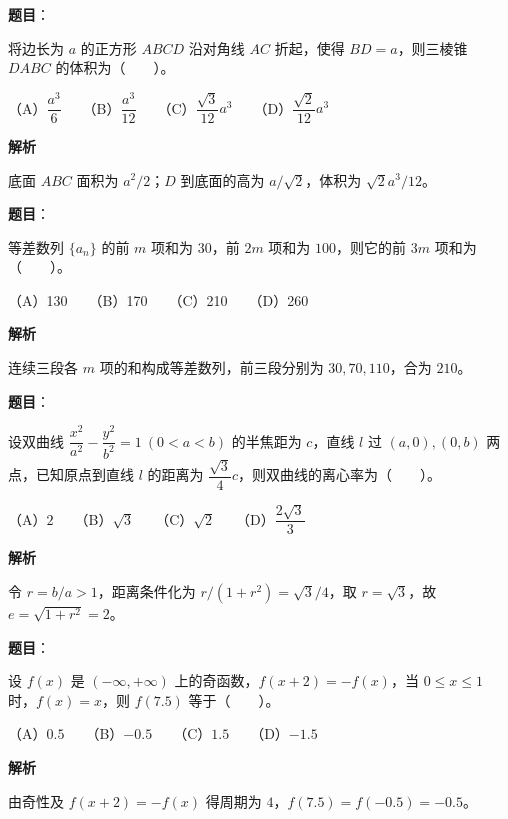 \begin{answer}

\textbf{题目}：

将边长为 $a$ 的正方形 $ABCD$ 沿对角线 $AC$ 折起，使得 $BD=a$，则三棱锥 $DABC$ 的体积为\mbox{（　　）}。

（A）$\dfrac{a^3}{6}$　　（B）$\dfrac{a^3}{12}$　　（C）$\dfrac{\sqrt{3}}{12}a^3$　　（D）$\dfrac{\sqrt{2}}{12}a^3$

\textbf{解析}

底面 $ABC$ 面积为 $a^2/2$；$D$ 到底面的高为 $a/\sqrt2$，体积为 $\sqrt2a^3/12$。


\end{answer}
\begin{answer}

\textbf{题目}：

等差数列 $\{a_n\}$ 的前 $m$ 项和为 $30$，前 $2m$ 项和为 $100$，则它的前 $3m$ 项和为\mbox{（　　）}。

（A）130　　（B）170　　（C）210　　（D）260

\textbf{解析}

连续三段各 $m$ 项的和构成等差数列，前三段分别为 $30,70,110$，合为 $210$。


\end{answer}
\begin{answer}

\textbf{题目}：

设双曲线 $\dfrac{x^2}{a^2}-\dfrac{y^2}{b^2}=1\ (0<a<b)$ 的半焦距为 $c$，直线 $l$ 过 $(a,0),(0,b)$ 两点，已知原点到直线 $l$ 的距离为 $\dfrac{\sqrt{3}}{4}c$，则双曲线的离心率为\mbox{（　　）}。

（A）$2$　　（B）$\sqrt{3}$　　（C）$\sqrt{2}$　　（D）$\dfrac{2\sqrt{3}}{3}$

\textbf{解析}

令 $r=b/a>1$，距离条件化为 $r/(1+r^2)=\sqrt3/4$，取 $r=\sqrt3$，故 $e=\sqrt{1+r^2}=2$。


\end{answer}
\begin{answer}

\textbf{题目}：

设 $f(x)$ 是 $(-\infty,+\infty)$ 上的奇函数，$f(x+2)=-f(x)$，当 $0\le x\le1$ 时，$f(x)=x$，则 $f(7.5)$ 等于\mbox{（　　）}。

（A）$0.5$　　（B）$-0.5$　　（C）$1.5$　　（D）$-1.5$

\textbf{解析}

由奇性及 $f(x+2)=-f(x)$ 得周期为 $4$，$f(7.5)=f(-0.5)=-0.5$。


\end{answer}
